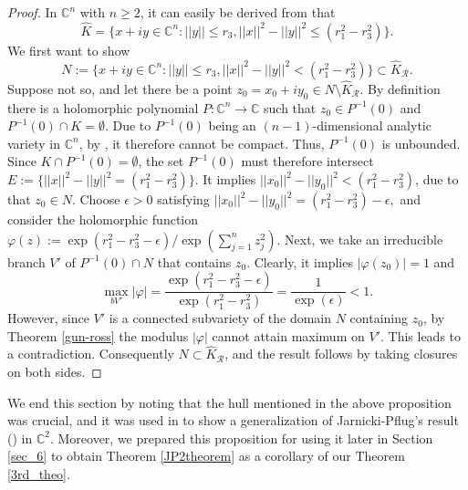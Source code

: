 \documentclass[12pt,reqno, a4paper]{amsart}
\theoremstyle{definition}
\theoremstyle{definition}
\numberwithin{equation}{section}
\def\C{\mathbb{C}}                              %
\def\eps{\epsilon}
\begin{document}
\begin{proof}
	In $\C^n$ with $ n\geq 2$, it can easily be derived from \cite[Example 4.4(a)]{haz-por} that $$\widehat{K}=\{x+iy\in \C^n: ||y||\leq r_3, ||x||^2-||y||^2\leq (r_1^2-r_3^2)\}.$$
	We first want to show $$N:=\{x+iy\in \C^n: ||y||\leq r_3, ||x||^2-||y||^2< (r_1^2-r_3^2)\} \subset \widehat{K}_{\mathcal{R}}.$$ Suppose not so, and let there be a point $z_0=x_0+iy_0\in N\setminus \widehat{K}_{\mathcal{R}}$. By definition there is a holomorphic polynomial $P:\C^n\to \C$ such that $z_0\in P^{-1}(0)$ and $P^{-1}(0) \cap K=\emptyset.$ Due to $P^{-1}(0)$ being an $(n-1)$-dimensional analytic variety in $\C^n$, by \cite[Corollary 17, Chap. III]{gun-ros}, it therefore cannot be compact. Thus, $P^{-1}(0)$ is unbounded. Since $K\cap P^{-1}(0)=\emptyset$, the set $P^{-1}(0)$ must therefore intersect ${E:=\{||x||^2-||y||^2= (r_1^2-r_3^2)\}}$. 
	It implies ${||x_0||^2-||y_0||^2< (r_1^2-r_3^2)}$, due to that $z_0\in N$.	Choose $\eps>0$ satisfying $||x_0||^2-||y_0||^2= (r_1^2-r_3^2)-\eps,$ and consider the holomorphic function $\varphi(z):= \exp{(r_1^2-r_3^2-\eps)}/\exp{(\sum_{j=1}^{n}z_j^2)}.$ Next, we take an irreducible branch $V'$ of $P^{-1}(0)\cap N$ that contains $z_0$. 
	Clearly, it implies $|\varphi(z_0)|=1$ and  $$\max\limits_{bV'}|\varphi|= \frac{\exp{(r_1^2-r_3^2-\eps)}}{\exp{(r_1^2-r_3^2)}}=\frac{1}{\exp(\eps)}<1.$$ 
	However, since $V'$ is a connected subvariety of the domain $N$ containing $z_0$, by {Theorem \ref{gun-ross}} the modulus $|\varphi|$ cannot attain maximum on $V'.$ This leads to a contradiction. Consequently $N\subset \widehat{K}_{\mathcal{R}}$, and the result follows by taking closures on both sides.
\end{proof}

We end this section by noting that the hull mentioned in the above proposition was crucial, and it was used in \cite[Example 4.4 (a)]{haz-por} to show a generalization of Jarnicki-Pflug's result (\cite{JP2}) in $\C^2$. Moreover, we prepared this proposition for using it later in {Section \ref{sec_6}} to obtain Theorem \ref{JP2theorem} as a corollary of our {Theorem \ref{3rd_theo}}.



	
\end{document}
